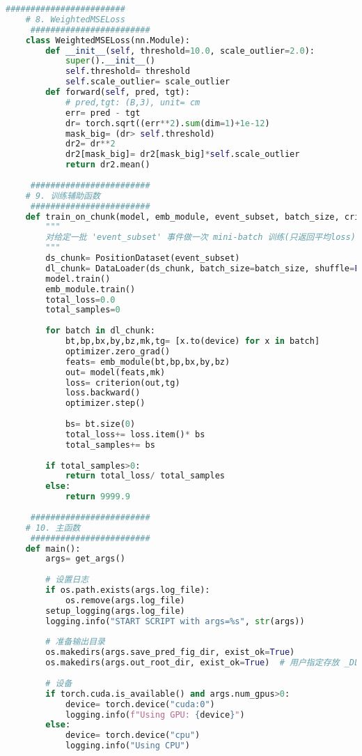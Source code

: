 \begin{lstlisting}[language=Python, caption={模型训练、验证与测试对比脚本 (train\_val\_test\_compare\_v1.py)}, label={lst:train_script}]
     ########################
    # 8. WeightedMSELoss
     ########################
    class WeightedMSELoss(nn.Module):
        def __init__(self, threshold=10.0, scale_outlier=2.0):
            super().__init__()
            self.threshold= threshold
            self.scale_outlier= scale_outlier
        def forward(self, pred, tgt):
            # pred,tgt: (B,3), unit= cm
            err= pred - tgt
            dr= torch.sqrt((err**2).sum(dim=1)+1e-12)
            mask_big= (dr> self.threshold)
            dr2= dr**2
            dr2[mask_big]= dr2[mask_big]*self.scale_outlier
            return dr2.mean()
    
     ########################
    # 9. 训练辅助函数
     ########################
    def train_on_chunk(model, emb_module, event_subset, batch_size, criterion, optimizer, device):
        """
        对给定一批 'event_subset' 事件做一次 mini-batch 训练(只返回平均loss).
        """
        ds_chunk= PositionDataset(event_subset)
        dl_chunk= DataLoader(ds_chunk, batch_size=batch_size, shuffle=False, collate_fn=collate_fn)
        model.train()
        emb_module.train()
        total_loss=0.0
        total_samples=0
    
        for batch in dl_chunk:
            bt,bp,bx,by,bz,mk,tg= [x.to(device) for x in batch]
            optimizer.zero_grad()
            feats= emb_module(bt,bp,bx,by,bz)
            out= model(feats,mk)
            loss= criterion(out,tg)
            loss.backward()
            optimizer.step()
    
            bs= bt.size(0)
            total_loss+= loss.item()* bs
            total_samples+= bs
    
        if total_samples>0:
            return total_loss/ total_samples
        else:
            return 9999.9
    
     ########################
    # 10. 主函数
     ########################
    def main():
        args= get_args()
    
        # 设置日志
        if os.path.exists(args.log_file):
            os.remove(args.log_file)
        setup_logging(args.log_file)
        logging.info("START SCRIPT with args=%s", str(args))
    
        # 准备输出目录
        os.makedirs(args.save_pred_fig_dir, exist_ok=True)
        os.makedirs(args.out_root_dir, exist_ok=True)  # 用户指定存放 _DL.root 的目录
    
        # 设备
        if torch.cuda.is_available() and args.num_gpus>0:
            device= torch.device("cuda:0")
            logging.info(f"Using GPU: {device}")
        else:
            device= torch.device("cpu")
            logging.info("Using CPU")
    

\end{lstlisting}
